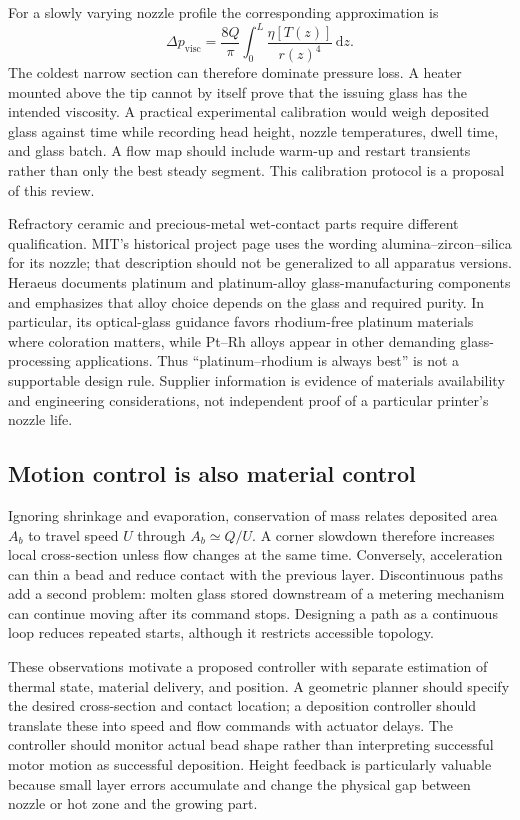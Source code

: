 For a slowly varying nozzle profile the corresponding approximation is
\begin{equation}
 \Delta p_{\mathrm{visc}}=\frac{8Q}{\pi}
 \int_0^L\frac{\eta[T(z)]}{r(z)^4}\,\mathrm{d}z.
\end{equation}
The coldest narrow section can therefore dominate pressure loss. A heater mounted above the tip cannot by itself prove that the issuing glass has the intended viscosity. A practical experimental calibration would weigh deposited glass against time while recording head height, nozzle temperatures, dwell time, and glass batch. A flow map should include warm-up and restart transients rather than only the best steady segment. This calibration protocol is a proposal of this review.

Refractory ceramic and precious-metal wet-contact parts require different qualification. MIT's historical project page uses the wording alumina--zircon--silica for its nozzle; that description should not be generalized to all apparatus versions. Heraeus documents platinum and platinum-alloy glass-manufacturing components and emphasizes that alloy choice depends on the glass and required purity. In particular, its optical-glass guidance favors rhodium-free platinum materials where coloration matters, while Pt--Rh alloys appear in other demanding glass-processing applications. Thus ``platinum--rhodium is always best'' is not a supportable design rule. Supplier information is evidence of materials availability and engineering considerations, not independent proof of a particular printer's nozzle life.\cite{acad_mitproject,acad_heraeus}

\subsection{Motion control is also material control}
Ignoring shrinkage and evaporation, conservation of mass relates deposited area $A_b$ to travel speed $U$ through $A_b\simeq Q/U$. A corner slowdown therefore increases local cross-section unless flow changes at the same time. Conversely, acceleration can thin a bead and reduce contact with the previous layer. Discontinuous paths add a second problem: molten glass stored downstream of a metering mechanism can continue moving after its command stops. Designing a path as a continuous loop reduces repeated starts, although it restricts accessible topology.

These observations motivate a proposed controller with separate estimation of thermal state, material delivery, and position. A geometric planner should specify the desired cross-section and contact location; a deposition controller should translate these into speed and flow commands with actuator delays. The controller should monitor actual bead shape rather than interpreting successful motor motion as successful deposition. Height feedback is particularly valuable because small layer errors accumulate and change the physical gap between nozzle or hot zone and the growing part.

